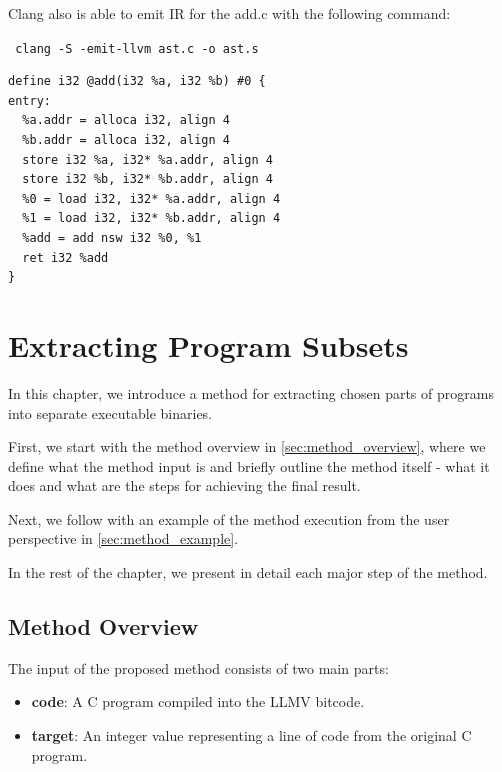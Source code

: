 \documentclass[12pt, twoside]{fithesis2}
\renewcommand{\_}{\leavevmode \kern0.07em\vbox{\hrule width0.4em}}
\newcommand{\squarebullet}{\textcolor{black}{\raisebox{0.15em}{\rule{4pt}{4pt}}}}
\newenvironment{myItemize}{
  \begin{itemize}[
    leftmargin=2em,
    rightmargin=1em,
    itemsep=\parskip,
    parsep=0em,
    topsep=0em,
    partopsep=0em
]
  \renewcommand{\labelitemi}{\squarebullet}
  \renewcommand{\labelitemii}{\textbullet}
}{
  \end{itemize}
}
\begin{document}
Clang also is able to emit IR for the add.c with the following command:

\texttt{
clang -S -emit-llvm ast.c -o ast.s
}

\begin{verbatim}
define i32 @add(i32 %a, i32 %b) #0 {
entry:
  %a.addr = alloca i32, align 4
  %b.addr = alloca i32, align 4
  store i32 %a, i32* %a.addr, align 4
  store i32 %b, i32* %b.addr, align 4
  %0 = load i32, i32* %a.addr, align 4
  %1 = load i32, i32* %b.addr, align 4
  %add = add nsw i32 %0, %1
  ret i32 %add
}
\end{verbatim}


\chapter{Extracting Program Subsets}
\label{chap:design}

In this chapter, we introduce a method for extracting chosen parts of programs
into separate executable binaries.

First, we start with the method overview in \autoref{sec:method_overview},
where we define what the method input is and briefly outline the method itself
- what it does and what are the steps for achieving the final result.

Next, we follow with an example of the method execution from the user
perspective in \autoref{sec:method_example}.

In the rest of the chapter, we present in detail each major step of the method.

\section{Method Overview}
\label{sec:method_overview}

The input of the proposed method consists of two main parts:

\begin{myItemize}
\item \textbf{code}: A C program compiled into the LLMV bitcode.
\item \textbf{target}: An integer value representing a line of code from the
original C program.
\end{myItemize}
\end{document}
